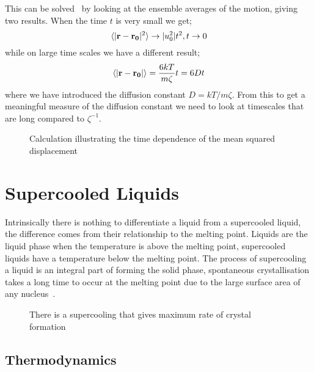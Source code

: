 This can be solved~\cite{mcquarrie:75} by looking at the ensemble averages of the motion, giving two results. When the time $t$ is very small we get;
\begin{equation}
    \langle | \mathbf{r} - \mathbf{r_0}|^2 \rangle \rightarrow |u_0^2|t^2,   t \rightarrow 0
\end{equation}
while on large time scales we have a different result;
\begin{equation}
    \langle | \mathbf{r} - \mathbf{r_0} | \rangle = \frac{6kT}{m\zeta} t = 6Dt
\end{equation}
where we have introduced the diffusion constant $D = kT/m\zeta$. From this to get a meaningful measure of the diffusion constant we need to look at timescales that are long compared to $\zeta^{-1}$.


\begin{figure}
    \label{fig:MSD}
    \caption{Calculation illustrating the time dependence of the mean squared displacement}
\end{figure}



\section{Supercooled Liquids}

Intrinsically there is nothing to differentiate a liquid from a supercooled liquid, the difference comes from their relationship to the melting point. Liquids are the liquid phase when the temperature is above the melting point, supercooled liquids have a temperature below the melting point. The process of supercooling a liquid is an integral part of forming the solid phase, spontaneous crystallisation takes a long time to occur at the melting point due to the large surface area of any nucleus~.

\begin{figure}
    \caption{There is a supercooling that gives maximum rate of crystal formation}
    \label{fig:supercool crys}
\end{figure}


\subsection{Thermodynamics}

